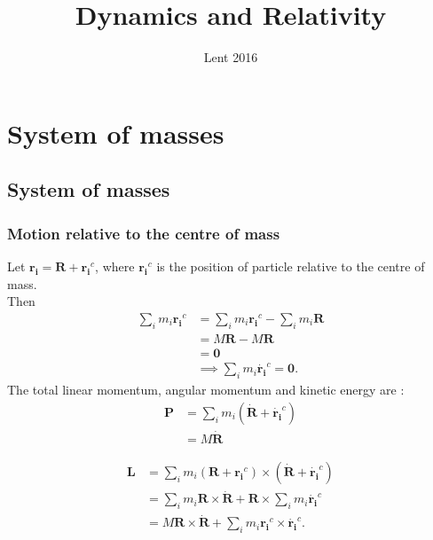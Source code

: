 \documentclass[a4paper]{article}
\begin{document}
\title{Dynamics and Relativity}
\date{Lent 2016}

\maketitle

\newpage

\tableofcontents

\newpage

\section{System of masses}
\subsection{System of masses}
\subsubsection{Motion relative to the centre of mass}
Let $\mathbf{r_{i}}=\mathbf{R}+\mathbf{r_{i}}^c$, where $\mathbf{r_{i}}^c$ is the position of particle relative to the centre of mass.\\
Then\\
\begin{equation*}
\begin{aligned}
\sum_{i} m_{i}\mathbf{r_{i}}^c &= \sum_{i}m_{i} \mathbf{r_{i}}^c - \sum_{i} m_{i} \mathbf{R}\\
&=M\mathbf{R} - M\mathbf{R}\\
&=\mathbf{0}\\
& \implies \sum_{i}m_{i}\mathbf{\dot{r_{i}}}^c = \mathbf{0}.
\end{aligned}
\end{equation*}
The total linear momentum, angular momentum and kinetic energy are :\\
\begin{equation*}
\begin{aligned}
\mathbf{P} &= \sum_{i} m_{i}\left(\dot{\mathbf{R}}+\dot{\mathbf{r_{i}}}^c\right)\\
&= M\dot{\mathbf{R}}
\end{aligned}
\end{equation*}

\begin{equation*}
\begin{aligned}
\mathbf{L} &= \sum_{i} m_{i} \left(\mathbf{R}+ \mathbf{r_{i}}^c \right) \times \left(\dot{\mathbf{R}} + \dot{\mathbf{r_{i}}}^c\right)\\
&= \sum_{i} m_{i} \mathbf{R} \times \dot{\mathbf{R}} + \mathbf{R} \times \sum_{i} m_{i} \dot{\mathbf{r_{i}}}^c\\
&= M\mathbf{R}\times \dot{\mathbf{R}} + \sum_{i} m_{i} \mathbf{r_{i}}^c \times \dot{\mathbf{r_{i}}}^c.
\end{aligned}
\end{equation*}
\end{document}
